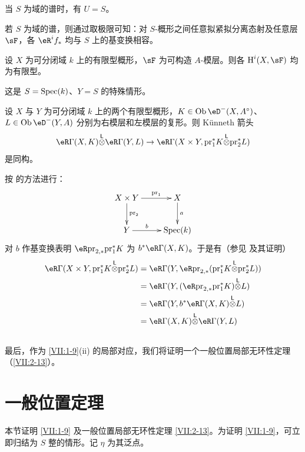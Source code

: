 当 $S$ 为域的谱时，有 $U=S$。

若 $S$ 为域的谱，则通过取极限可知：对 $S$-概形之间任意拟紧拟分离态射及任意层 $\sF$，各 $\eR^i f_\ast$ 均与 $S$ 上的基变换相容。

\begin{corollary_}\label{VII:1-10}
设 $X$ 为可分闭域 $k$ 上的有限型概形，$\sF$ 为可构造 $A$-模层。则各 $\h^i(X,\sF)$ 均为有限型。
\end{corollary_}

这是 $S=\operatorname{Spec}(k)$、$Y=S$ 的特殊情形。

\begin{corollary_}\label{VII:1-11}
设 $X$ 与 $Y$ 为可分闭域 $k$ 上的两个有限型概形，$K\in \ob\eD^-(X,A^\circ)$、$L\in \ob\eD^-(Y,A)$ 分别为右模层和左模层的复形。则 K\"unneth 箭头
\[
  \eR \Gamma(X,K) \lotimes \eR \Gamma(Y,L) \to \eR\Gamma(X\times Y,\pr_1^\ast K \lotimes \pr_2^\ast L)
\]
是同构。
\end{corollary_}

按 \cite[XVII 5.4.3]{sga4} 的方法进行：
\[\xymatrix{
  X\times Y \ar[r]^-{\text{pr}_1} \ar[d]^-{\text{pr}_2}
    & X \ar[d]^-a \\
  Y \ar[r]^-b
    & \spec(k)
}\]
对 $b$ 作基变换表明 $\eR\pr_{2,\ast}{} \pr_1^\ast K$ 为 $b^\ast \eR\Gamma(X,K)$。于是有（参见 \cite[XVII 5.2.11]{sga4} 及其证明）
\begin{align*}
  \eR\Gamma(X\times Y,\pr_1^\ast K\lotimes \pr_2^\ast L)
    &= \eR\Gamma(Y,\eR \pr_{2,\ast}(\pr_1^\ast K\lotimes \pr_2^\ast L)) \\
    &= \eR\Gamma(Y,(\eR\pr_{2,\ast}\pr_1^\ast K)\lotimes L) \\
    &= \eR\Gamma(Y,b^\ast \eR\Gamma(X,K)\lotimes L) \\
    &= \eR\Gamma(X,K)\lotimes \eR\Gamma(Y,L)
\end{align*}

\subsection{}\label{VII:1-12}

最后，作为 \ref{VII:1-9}(ii) 的局部对应，我们将证明一个一般位置局部无环性定理（\ref{VII:2-13}）。

\section{一般位置定理}\label{VII:2}

本节证明 \ref{VII:1-9} 及一般位置局部无环性定理 \ref{VII:2-13}。为证明 \ref{VII:1-9}，可立即归结为 $S$ 整的情形。记 $\eta$ 为其泛点。


